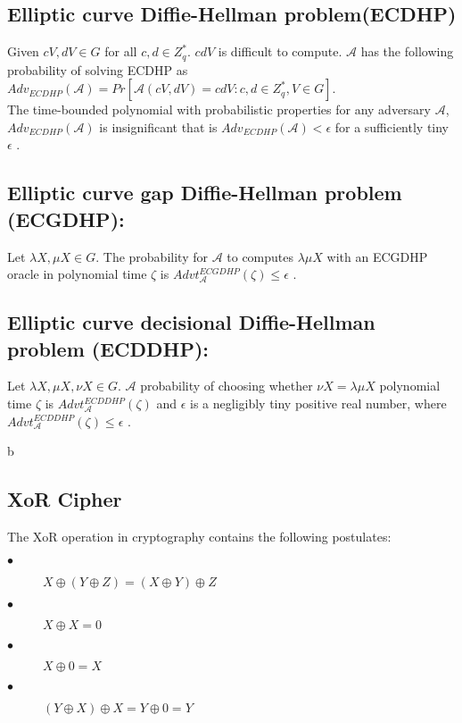 \documentclass[3p,times,onecolumn]{elsarticle}
\begin{document}
\subsection{\textbf{ Elliptic curve Diffie-Hellman problem(ECDHP)}}
Given $cV, dV\in G$ for all $c, d\in Z_{q}^{*}$. $cdV$ is difficult to compute.  $\mathcal{A}$ has the following probability of solving ECDHP as  $Adv_{ECDHP}(\mathcal{A})=Pr[\mathcal{A}(cV,dV)=cdV: c, d \in Z_{q}^{*}, V\in G]$.\\
The time-bounded polynomial with probabilistic properties for any adversary $\mathcal{A}$, $Adv_{ECDHP}(\mathcal{A})$ is insignificant that is $Adv_{ECDHP}(\mathcal{A})<\epsilon$ for a sufficiently tiny $\epsilon$ \cite{b7}.
\subsection{\textbf{Elliptic curve gap Diffie-Hellman problem (ECGDHP)}:}  Let  $\lambda X, \mu X \in G$. The probability for $\mathcal{A}$ to computes $\lambda \mu X$ with an ECGDHP oracle in polynomial time $\zeta$ is  $Advt^{ECGDHP}_{\mathcal{A}}(\zeta) \leq \epsilon$ \cite{kv1}.

\subsection{ \textbf{Elliptic curve decisional Diffie-Hellman  problem (ECDDHP)}:} Let $\lambda X, \mu X, \nu X \in G$. $\mathcal{A}$ probability of choosing whether $\nu X=\lambda \mu X$  polynomial time $\zeta$ is $Advt^{ECDDHP}_{\mathcal{A}}(\zeta)$  and $\epsilon$ is a negligibly tiny positive real number, where $Advt^{ECDDHP}_{\mathcal{A}}(\zeta) \leq \epsilon$ \cite{kv1}.

 b
\subsection{\textbf{XoR Cipher}}
The XoR operation in cryptography contains the following postulates:
\begin{description}
\item[$\bullet$] $X \oplus (Y \oplus Z) = (X \oplus Y) \oplus Z$
\item[$\bullet$] $X \oplus X = 0$
\item[$\bullet$] $X \oplus 0 = X$
\item[$\bullet$]  $(Y\oplus X) \oplus X = Y \oplus 0 = Y$
\end{description}
\end{document}
